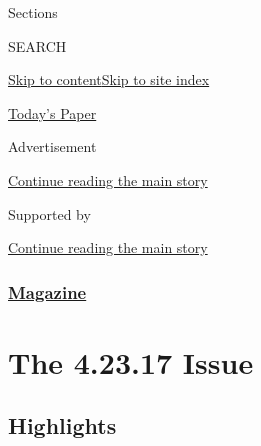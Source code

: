 Sections

SEARCH

\protect\hyperlink{site-content}{Skip to
content}\protect\hyperlink{site-index}{Skip to site index}

\href{https://myaccount.nytimes3xbfgragh.onion/auth/login?response_type=cookie\&client_id=vi}{}

\href{https://www.nytimes3xbfgragh.onion/section/todayspaper}{Today's
Paper}

Advertisement

\protect\hyperlink{after-top}{Continue reading the main story}

Supported by

\protect\hyperlink{after-sponsor}{Continue reading the main story}

\hypertarget{magazine}{%
\subsubsection{\texorpdfstring{\href{/section/magazine}{Magazine}}{Magazine}}\label{magazine}}

\hypertarget{the-42317-issue}{%
\section{The 4.23.17 Issue}\label{the-42317-issue}}

\hypertarget{highlights}{%
\subsection{Highlights}\label{highlights}}

